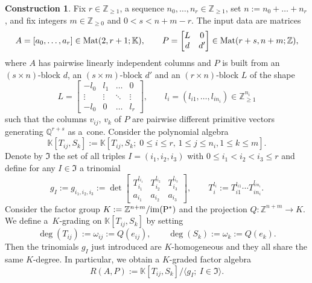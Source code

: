 \documentclass[10pt,a4paper]{amsart}
\theoremstyle{definition}
\newtheorem{construction}[thm]{Construction}
\def\KK{{\mathbb K}}
\def\ZZ{{\mathbb Z}}
\def\QQ{{\mathbb Q}}
\def\Mat{{\rm Mat}}
\def\bangle#1{{\langle #1 \rangle}}
\numberwithin{equation}{section}
\begin{document}
\begin{construction}
\label{constr:RAP}
Fix $r \in \ZZ_{\ge 1}$, a sequence
$n_0, \dots, n_r \in \ZZ_{\ge 1}$, set
$n := n_0 + \dots + n_r$, and fix
integers $m \in \ZZ_{\ge 0}$ and $0 < s < n+m-r$.
The input data are matrices
\[
A =[a_0, \dots, a_r] \in\Mat(2,r+1;\KK),\qquad
P =\begin{bmatrix}
L & 0
\\
d & d'
\end{bmatrix}
 \in
\Mat(r+s,n+m; \ZZ),
\]
where $A$ has pairwise linearly independent
columns and $P$ is built from an
$(s \times n)$-block $d$, an $(s \times m)$-block
$d'$ and an $(r \times n)$-block $L$
of the shape
\[
L = \begin{bmatrix}
-l_0 & l_1 & \dots & 0
\\
\vdots & \vdots & \ddots & \vdots
\\
-l_0 & 0 &\dots & l_{r}
\end{bmatrix}\!,\qquad
l_i = (l_{i1}, \dots, l_{in_i}) \in \ZZ_{\ge 1}^{n_i}
\]
such that the columns $v_{ij}$, $v_k$ of
$P$ are pairwise different primitive vectors
generating $\QQ^{r+s}$ as a~cone.
Consider the polynomial algebra
\[
\KK[T_{ij},S_k] :=
\KK[T_{ij},S_k; \; 0 \le i \le r, \, 1 \le j \le n_i, 1 \le k \le m].
\]
Denote by $\mathfrak{I}$ the set of
all triples $I = (i_1,i_2,i_3)$ with
$0 \le i_1 < i_2 < i_3 \le r$
and define for any $I \in \mathfrak{I}$
a trinomial
\[
g_I := g_{i_1,i_2,i_3} := \det
\begin{bmatrix}
T_{i_1}^{l_{i_1}} & T_{i_2}^{l_{i_2}} & T_{i_3}^{l_{i_3}}
\\
a_{i_1} & a_{i_2} & a_{i_3}
\end{bmatrix}\!,\qquad
T_i^{l_i} := T_{i1}^{l_{i1}} \cdots T_{in_i}^{l_{in_i}}.
\]
Consider the factor group
$K := \ZZ^{n+m}/\rm{im}(P^*)$
and the projection $Q \colon \ZZ^{n+m} \to K$.
We define a~$K$-grading on
$\KK[T_{ij},S_k]$ by setting
\[
\deg(T_{ij}) :=\omega_{ij} :=Q(e_{ij}),\qquad
\deg(S_{k}) :=\omega_k :=Q(e_{k}).
\]
Then the trinomials $g_I$ just introduced
are $K$-homogeneous and they all share the
same $K$-degree.
In particular, we obtain a $K$-graded factor
algebra
\[
R(A,P) :=\KK[T_{ij},S_k] / \bangle{g_I; \ I \in \mathfrak{I}}.
\]
\end{construction}
\end{document}
